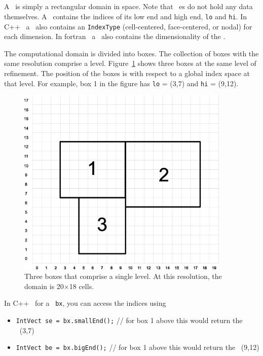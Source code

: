 \subsection{\BoxType}

A \BoxType\ is simply a rectangular domain in space.  Note that \BoxType~es
do not hold any data themselves. A \BoxType\ contains
the indices of its low end and high end, {\tt lo} and {\tt hi}.
In C++ \BoxLib\, a \BoxType\ also
contains an {\tt IndexType} (cell-centered, face-centered, or nodal) for each
dimension.  In fortran \BoxLib\, a \BoxType\ also contains the dimensionality
of the \BoxType.

The computational domain is divided into boxes.  The collection of
boxes with the same resolution comprise a level.
Figure~\ref{fig:boxes} shows three boxes at the same level of
refinement.  The position of the boxes is with respect to a global
index space at that level.  For example, box 1 in the figure has 
{\tt lo} = (3,7) and {\tt hi} = (9,12).
\begin{figure}[h]
\centering
\includegraphics[width=4.0in]{./BoxLib/index_grid2}
\caption{\label{fig:boxes} Three boxes that comprise a single level.
At this resolution, the domain is 20$\times$18 cells.}
\end{figure}

In C++ \BoxLib\, for a \BoxType\ {\tt bx},
you can access the indices using
\begin{itemize}
\item {{\tt IntVect se = bx.smallEnd();} // for box 1 above this would return
      the \IntVect\ (3,7)}
\item {{\tt IntVect be = bx.bigEnd();} // for box 1 above this would return 
      the \IntVect\ (9,12)}
\end{itemize}

